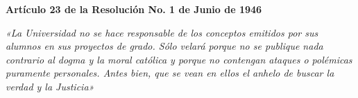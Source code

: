 \noindent \textbf{Artículo 23 de la Resolución No. 1 de Junio de 1946} \\

\vspace{0.25cm}

\noindent \textit{«La Universidad no se hace responsable de los conceptos emitidos por sus alumnos en sus proyectos de grado. Sólo velará porque no se publique nada contrario al dogma y la moral católica y porque no contengan ataques o polémicas puramente personales. Antes bien, que se vean en ellos el anhelo de buscar la verdad y la Justicia»}
